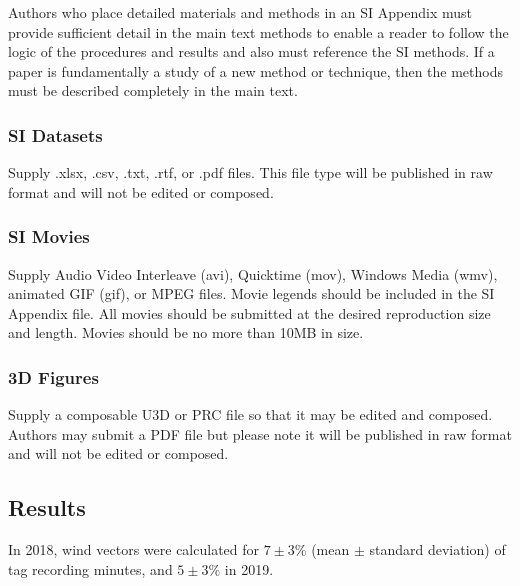 \documentclass[9pt,twocolumn,twoside,lineno]{pnas-new}
\begin{document}
Authors who place detailed materials and methods in an SI Appendix must provide sufficient detail in the main text methods to enable a reader to follow the logic of the procedures and results and also must reference the SI methods. If a paper is fundamentally a study of a new method or technique, then the methods must be described completely in the main text.

\subsubsection*{SI Datasets} 

Supply .xlsx, .csv, .txt, .rtf, or .pdf files. This file type will be published in raw format and will not be edited or composed.


\subsubsection*{SI Movies}

Supply Audio Video Interleave (avi), Quicktime (mov), Windows Media (wmv), animated GIF (gif), or MPEG files. Movie legends should be included in the SI Appendix file. All movies should be submitted at the desired reproduction size and length. Movies should be no more than 10MB in size.


\subsubsection*{3D Figures}

Supply a composable U3D or PRC file so that it may be edited and composed. Authors may submit a PDF file but please note it will be published in raw format and will not be edited or composed.

\subsection{Results}

    In 2018, wind vectors were calculated for $7 \pm 3\%$ (mean $\pm$ standard deviation) of tag recording minutes, and $5 \pm 3\%$ in 2019.
\end{document}
